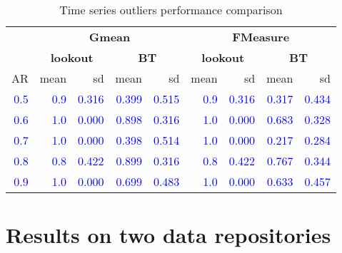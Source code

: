 \documentclass[12pt]{article}
\theoremstyle{definition}
\theoremstyle{definition}
\theoremstyle{definition}
\theoremstyle{definition}
\theoremstyle{remark}
\begin{document}
\begin{table}

\caption{\label{tab:timeseriesdatviz}Time series outliers performance comparison}
\centering
\begin{tabular}[t]{rrrrrrrrr}
\toprule
\multicolumn{1}{c}{\textbf{}} & \multicolumn{4}{c}{\textbf{Gmean}} & \multicolumn{4}{c}{\textbf{FMeasure}} \\
\cmidrule(l{3pt}r{3pt}){2-5} \cmidrule(l{3pt}r{3pt}){6-9}
\multicolumn{1}{c}{\textbf{}} & \multicolumn{2}{c}{\textbf{lookout}} & \multicolumn{2}{c}{\textbf{BT}} & \multicolumn{2}{c}{\textbf{lookout}} & \multicolumn{2}{c}{\textbf{BT}} \\
\cmidrule(l{3pt}r{3pt}){2-3} \cmidrule(l{3pt}r{3pt}){4-5} \cmidrule(l{3pt}r{3pt}){6-7} \cmidrule(l{3pt}r{3pt}){8-9}
AR & mean & sd & mean & sd & mean & sd & mean & sd\\
\midrule
\textcolor{blue}{0.5} & \textcolor{blue}{0.9} & \textcolor{blue}{0.316} & \textcolor{blue}{0.399} & \textcolor{blue}{0.515} & \textcolor{blue}{0.9} & \textcolor{blue}{0.316} & \textcolor{blue}{0.317} & \textcolor{blue}{0.434}\\
\textcolor{blue}{0.6} & \textcolor{blue}{1.0} & \textcolor{blue}{0.000} & \textcolor{blue}{0.898} & \textcolor{blue}{0.316} & \textcolor{blue}{1.0} & \textcolor{blue}{0.000} & \textcolor{blue}{0.683} & \textcolor{blue}{0.328}\\
\textcolor{blue}{0.7} & \textcolor{blue}{1.0} & \textcolor{blue}{0.000} & \textcolor{blue}{0.398} & \textcolor{blue}{0.514} & \textcolor{blue}{1.0} & \textcolor{blue}{0.000} & \textcolor{blue}{0.217} & \textcolor{blue}{0.284}\\
\textcolor{blue}{0.8} & \textcolor{blue}{0.8} & \textcolor{blue}{0.422} & \textcolor{blue}{0.899} & \textcolor{blue}{0.316} & \textcolor{blue}{0.8} & \textcolor{blue}{0.422} & \textcolor{blue}{0.767} & \textcolor{blue}{0.344}\\
\textcolor{blue}{0.9} & \textcolor{blue}{1.0} & \textcolor{blue}{0.000} & \textcolor{blue}{0.699} & \textcolor{blue}{0.483} & \textcolor{blue}{1.0} & \textcolor{blue}{0.000} & \textcolor{blue}{0.633} & \textcolor{blue}{0.457}\\
\bottomrule
\end{tabular}
\end{table}

\hypertarget{sec:applications}{%
\section{Results on two data repositories}\label{sec:applications}}
\end{document}

